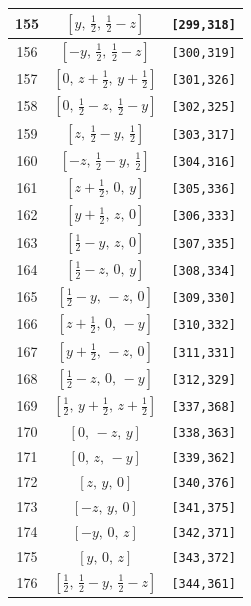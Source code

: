 \documentclass[fleqn,8pt]{jsarticle}
\begin{document}
\begin{longtable}{ccc}
155 & $\left[ y,\, \frac{1}{2},\, \frac{1}{2} - z \right]$ & {\tt [299,318]} \\ \hline
156 & $\left[ - y,\, \frac{1}{2},\, \frac{1}{2} - z \right]$ & {\tt [300,319]} \\ \hline
157 & $\left[ 0,\, z + \frac{1}{2},\, y + \frac{1}{2} \right]$ & {\tt [301,326]} \\ \hline
158 & $\left[ 0,\, \frac{1}{2} - z,\, \frac{1}{2} - y \right]$ & {\tt [302,325]} \\ \hline
159 & $\left[ z,\, \frac{1}{2} - y,\, \frac{1}{2} \right]$ & {\tt [303,317]} \\ \hline
160 & $\left[ - z,\, \frac{1}{2} - y,\, \frac{1}{2} \right]$ & {\tt [304,316]} \\ \hline
161 & $\left[ z + \frac{1}{2},\, 0,\, y \right]$ & {\tt [305,336]} \\ \hline
162 & $\left[ y + \frac{1}{2},\, z,\, 0 \right]$ & {\tt [306,333]} \\ \hline
163 & $\left[ \frac{1}{2} - y,\, z,\, 0 \right]$ & {\tt [307,335]} \\ \hline
164 & $\left[ \frac{1}{2} - z,\, 0,\, y \right]$ & {\tt [308,334]} \\ \hline
165 & $\left[ \frac{1}{2} - y,\, - z,\, 0 \right]$ & {\tt [309,330]} \\ \hline
166 & $\left[ z + \frac{1}{2},\, 0,\, - y \right]$ & {\tt [310,332]} \\ \hline
167 & $\left[ y + \frac{1}{2},\, - z,\, 0 \right]$ & {\tt [311,331]} \\ \hline
168 & $\left[ \frac{1}{2} - z,\, 0,\, - y \right]$ & {\tt [312,329]} \\ \hline
169 & $\left[ \frac{1}{2},\, y + \frac{1}{2},\, z + \frac{1}{2} \right]$ & {\tt [337,368]} \\ \hline
170 & $\left[ 0,\, - z,\, y \right]$ & {\tt [338,363]} \\ \hline
171 & $\left[ 0,\, z,\, - y \right]$ & {\tt [339,362]} \\ \hline
172 & $\left[ z,\, y,\, 0 \right]$ & {\tt [340,376]} \\ \hline
173 & $\left[ - z,\, y,\, 0 \right]$ & {\tt [341,375]} \\ \hline
174 & $\left[ - y,\, 0,\, z \right]$ & {\tt [342,371]} \\ \hline
175 & $\left[ y,\, 0,\, z \right]$ & {\tt [343,372]} \\ \hline
176 & $\left[ \frac{1}{2},\, \frac{1}{2} - y,\, \frac{1}{2} - z \right]$ & {\tt [344,361]} \\ \hline

\end{longtable}
\end{document}
